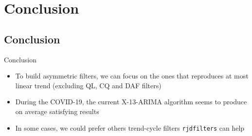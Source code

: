 \documentclass[10pt,xcolor=table,color={dvipsnames,usenames},ignorenonframetext,usepdftitle=false,english]{beamer}
\providecommand{\tightlist}{%
  \setlength{\parskip}{0pt}
  }
\newcommand\1{\mathds{1}}
\begin{document}
\hypertarget{conclusion}{%
\section{Conclusion}\label{conclusion}}

\hypertarget{conclusion-1}{%
\subsection{Conclusion}\label{conclusion-1}}

\begin{frame}[fragile]{Conclusion}
\protect\hypertarget{conclusion-2}{}
\begin{itemize}
\tightlist
\item
  To build asymmetric filters, we can focus on the ones that reproduces
  at most linear trend (excluding QL, CQ and DAF filters)
\end{itemize}

\bigskip \pause

\begin{itemize}
\tightlist
\item
  During the COVID-19, the current X-13-ARIMA algorithm seems to produce
  on average satisfying results
\end{itemize}

\bigskip \pause

\begin{itemize}
\tightlist
\item
  In some cases, we could prefer others trend-cycle filters
   \texttt{rjdfilters} can help
\end{itemize}
\end{frame}
\end{document}
